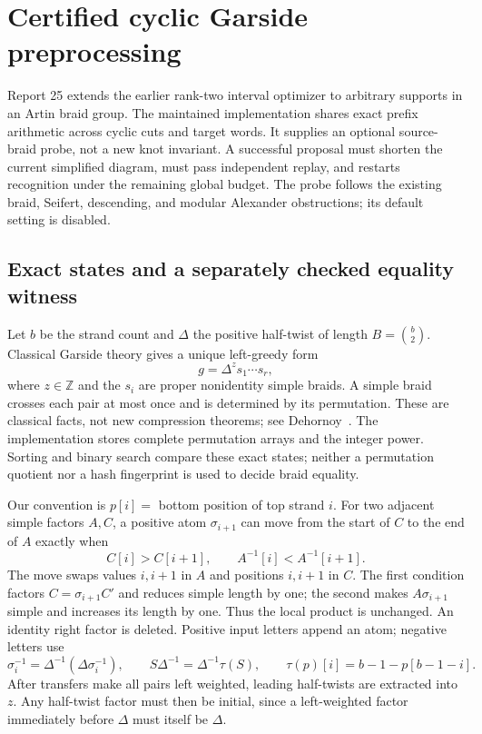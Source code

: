 \section{Certified cyclic Garside preprocessing}
\label{sec:cyclic-garside}

Report 25 extends the earlier rank-two interval optimizer to arbitrary
supports in an Artin braid group.  The maintained implementation shares
exact prefix arithmetic across cyclic cuts and target words.  It supplies
an optional source-braid probe, not a new knot invariant.  A successful
proposal must shorten the current simplified diagram, must pass independent
replay, and restarts recognition under the remaining global budget.
The probe follows the existing braid, Seifert, descending, and modular
Alexander obstructions; its default setting is disabled.

\subsection{Exact states and a separately checked equality witness}

Let $b$ be the strand count and $\Delta$ the positive half-twist of length
$B=\binom b2$.  Classical Garside theory gives a unique left-greedy form
\[
 g=\Delta^z s_1\cdots s_r,
\]
where $z\in\mathbb Z$ and the $s_i$ are proper nonidentity simple braids.
A simple braid crosses each pair at most once and is determined by its
permutation.  These are classical facts, not new compression theorems;
see Dehornoy~\cite{dehornoy-garside}.  The implementation stores complete
permutation arrays and the integer power.  Sorting and binary search
compare these exact states; neither a permutation quotient nor a hash
fingerprint is used to decide braid equality.

Our convention is $p[i]=$ bottom position of top strand $i$.  For two
adjacent simple factors $A,C$, a positive atom $\sigma_{i+1}$ can move
from the start of $C$ to the end of $A$ exactly when
\[
 C[i]>C[i+1],\qquad A^{-1}[i]<A^{-1}[i+1].
\]
The move swaps values $i,i+1$ in $A$ and positions $i,i+1$ in $C$.
The first condition factors $C=\sigma_{i+1}C'$ and reduces simple length
by one; the second makes $A\sigma_{i+1}$ simple and increases its length
by one.  Thus the local product is unchanged.  An identity right factor
is deleted.  Positive input letters append an atom; negative letters use
\[
 \sigma_i^{-1}=\Delta^{-1}(\Delta\sigma_i^{-1}),\qquad
 S\Delta^{-1}=\Delta^{-1}\tau(S),\qquad
 \tau(p)[i]=b-1-p[b-1-i].
\]
After transfers make all pairs left weighted, leading half-twists are
extracted into $z$.  Any half-twist factor must then be initial, since a
left-weighted factor immediately before $\Delta$ must itself be $\Delta$.

